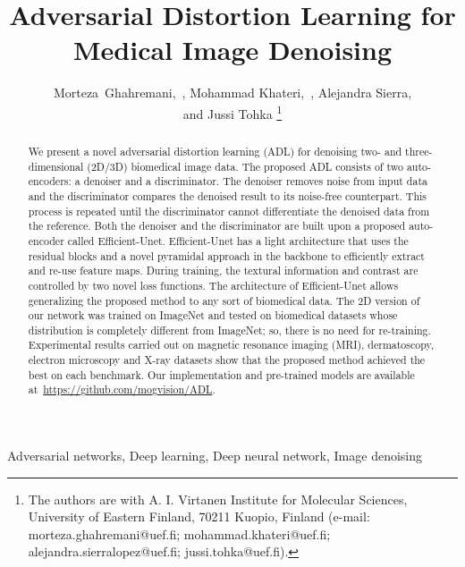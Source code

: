\documentclass[journal,twoside,web]{ieeecolor}
\begin{document}
\title{Adversarial Distortion Learning for Medical Image Denoising}
\author{Morteza~Ghahremani,~, Mohammad Khateri,~, Alejandra Sierra, \\and Jussi Tohka
\thanks{The authors are with A. I. Virtanen Institute for Molecular Sciences, University of Eastern Finland, 70211 Kuopio, Finland (e-mail: morteza.ghahremani@uef.fi; mohammad.khateri@uef.fi; alejandra.sierralopez@uef.fi; jussi.tohka@uef.fi). }
}

\maketitle

\begin{abstract} 
We present a novel adversarial distortion learning (ADL) for denoising two- and three-dimensional (2D/3D) biomedical image data. 
The proposed ADL consists of two auto-encoders: a denoiser and a discriminator. The denoiser removes noise from input data and the discriminator compares the denoised result to its noise-free counterpart. This process is repeated until the discriminator cannot differentiate the denoised data from the reference. 
Both the denoiser and the discriminator are built upon a proposed auto-encoder called Efficient-Unet. 
Efficient-Unet has a light architecture that uses the residual blocks and a novel pyramidal approach in the backbone to efficiently extract and re-use feature maps. During training, the textural information and contrast are controlled by two novel loss functions. 
The architecture of Efficient-Unet allows generalizing the proposed method to any sort of biomedical data. 
The 2D version of our network was trained on ImageNet and tested on biomedical datasets whose distribution is completely different from ImageNet; so, there is no need for re-training. 
Experimental results carried out on magnetic resonance imaging (MRI), dermatoscopy, electron microscopy and X-ray datasets show that the proposed method achieved the best on each benchmark. 
Our implementation and pre-trained models are available at~\url{https://github.com/mogvision/ADL}.
\end{abstract}

\begin{IEEEkeywords}
Adversarial networks, Deep learning, Deep neural network, Image denoising 
\end{IEEEkeywords}
\end{document}

